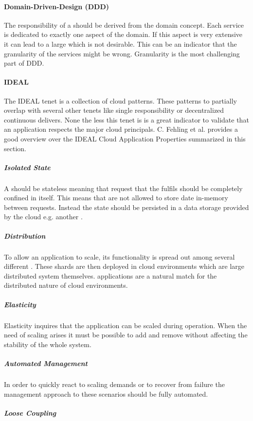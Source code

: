 \paragraph{Domain-Driven-Design (DDD)}

The responsibility of a \ms{} should be derived from the domain concept. Each
service is dedicated to exactly one aspect of the domain. If this aspect is very
extensive it can lead to a large \ms{} which is not desirable. This can be an
indicator that the granularity of the services might be wrong. Granularity is
the most challenging part of DDD\cite{millett2015patterns}.

\paragraph{IDEAL}

The IDEAL tenet is a collection of cloud patterns. These patterns to partially
overlap with several other tenets like single responsibility or decentralized
continuous delivers. None the less this tenet is is a great indicator to
validate that an application respects the major cloud principals. C. Fehling et
al. provides a good overview over the  IDEAL Cloud Application Properties
summarized in this section\cite{fehling2015cloud}.

\subparagraph{Isolated State}
A \ms{} should be stateless meaning that request that the \ms{} fulfils should
be completely confined in itself. This means that \mss{} are not allowed to
store date in-memory between requests. Instead the state should be persisted in
a data storage provided by the cloud e.g. another \ms{}.

\subparagraph{Distribution}
To allow an application to scale, its functionality is spread out among several
different \mss{}. These shards are then deployed in cloud environments which are
large distributed system themselves. \ms{} applications are a natural match for
the distributed nature of cloud environments.

\subparagraph{Elasticity}
Elasticity inquires that the application can be scaled during operation. When
the need of scaling arises it must be possible to add and remove \mss{} without
affecting the stability of the whole system.

\subparagraph{Automated Management}
In order to quickly react to scaling demands or to recover from failure the
management approach to these scenarios should be fully automated.

\subparagraph{Loose Coupling}

